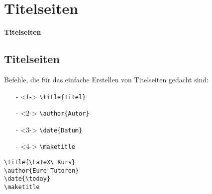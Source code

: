 \section{Titelseiten}
\begin{frame}[c]
	\begin{center}
		\LARGE \textbf{Titelseiten}
	\end{center}
\end{frame}
\subsection*{Titelseiten}
\begin{frame}[fragile]
	Befehle, die für das einfache Erstellen von Titelseiten gedacht sind:
	\begin{itemize}
		\item[-]<1->
			\lstinline|\title{Titel}|
		\item[-]<2->
			\lstinline|\author{Autor}|
		\item[-]<3->
			\lstinline|\date{Datum}|
		\item[-]<4->
			\lstinline|\maketitle|
	\end{itemize}

	\Code
	\begin{lstlisting}
\title{\LaTeX\ Kurs}
\author{Eure Tutoren}
\date{\today}
\maketitle
	\end{lstlisting}
\end{frame}
